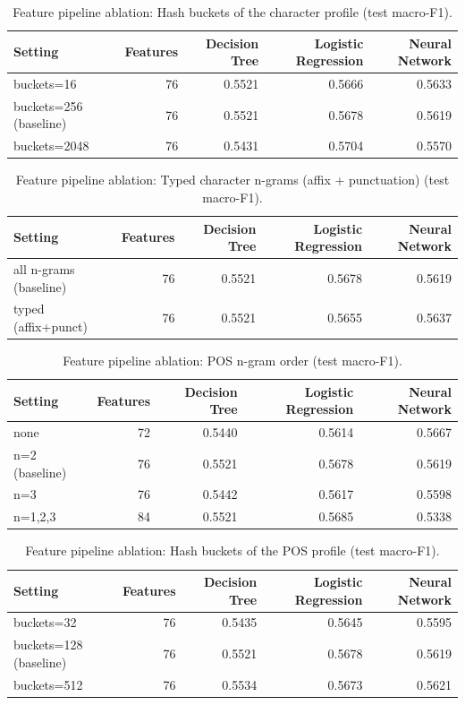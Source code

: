 \begin{table}[ht]
\centering
\small
\caption{Feature pipeline ablation: Hash buckets of the character profile (test macro-F1).}
\label{tab:pipeline-char-buckets}
\begin{tabular}{lrrrr}
\toprule
Setting & Features & Decision Tree & Logistic Regression & Neural Network \\
\midrule
buckets=16 & 76 & 0.5521 & 0.5666 & 0.5633 \\
buckets=256 (baseline) & 76 & 0.5521 & 0.5678 & 0.5619 \\
buckets=2048 & 76 & 0.5431 & 0.5704 & 0.5570 \\
\bottomrule
\end{tabular}
\end{table}

\begin{table}[ht]
\centering
\small
\caption{Feature pipeline ablation: Typed character n-grams (affix + punctuation) (test macro-F1).}
\label{tab:pipeline-char-typed}
\begin{tabular}{lrrrr}
\toprule
Setting & Features & Decision Tree & Logistic Regression & Neural Network \\
\midrule
all n-grams (baseline) & 76 & 0.5521 & 0.5678 & 0.5619 \\
typed (affix+punct) & 76 & 0.5521 & 0.5655 & 0.5637 \\
\bottomrule
\end{tabular}
\end{table}

\begin{table}[ht]
\centering
\small
\caption{Feature pipeline ablation: POS n-gram order (test macro-F1).}
\label{tab:pipeline-pos-n}
\begin{tabular}{lrrrr}
\toprule
Setting & Features & Decision Tree & Logistic Regression & Neural Network \\
\midrule
none & 72 & 0.5440 & 0.5614 & 0.5667 \\
n=2 (baseline) & 76 & 0.5521 & 0.5678 & 0.5619 \\
n=3 & 76 & 0.5442 & 0.5617 & 0.5598 \\
n=1,2,3 & 84 & 0.5521 & 0.5685 & 0.5338 \\
\bottomrule
\end{tabular}
\end{table}

\begin{table}[ht]
\centering
\small
\caption{Feature pipeline ablation: Hash buckets of the POS profile (test macro-F1).}
\label{tab:pipeline-pos-buckets}
\begin{tabular}{lrrrr}
\toprule
Setting & Features & Decision Tree & Logistic Regression & Neural Network \\
\midrule
buckets=32 & 76 & 0.5435 & 0.5645 & 0.5595 \\
buckets=128 (baseline) & 76 & 0.5521 & 0.5678 & 0.5619 \\
buckets=512 & 76 & 0.5534 & 0.5673 & 0.5621 \\
\bottomrule
\end{tabular}
\end{table}

